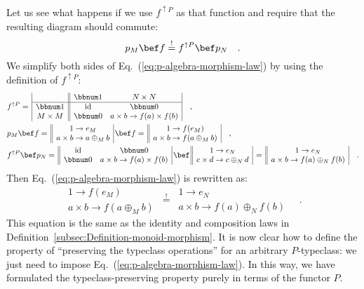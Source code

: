 \noindent Let us see what happens if we use $f^{\uparrow P}$ as that
function and require that the resulting diagram should commute:\vspace{-0.4\baselineskip}
\begin{equation}
p_{M}\bef f\overset{!}{=}f^{\uparrow P}\bef p_{N}\quad.\label{eq:p-algebra-morphism-law}
\end{equation}
We simplify both sides of Eq.~(\ref{eq:p-algebra-morphism-law})
by using the definition of $f^{\uparrow P}$:
\begin{align*}
 & f^{\uparrow P}=\,\begin{array}{|c||cc|}
 & \bbnum 1 & N\times N\\
\hline \bbnum 1 & \text{id} & \bbnum 0\\
M\times M & \bbnum 0 & a\times b\rightarrow f(a)\times f(b)
\end{array}\quad,\\
 & p_{M}\bef f=\,\begin{array}{||c|}
1\rightarrow e_{M}\\
a\times b\rightarrow a\oplus_{M}b
\end{array}\,\bef f=\,\begin{array}{||c|}
1\rightarrow f(e_{M})\\
a\times b\rightarrow f(a\oplus_{M}b)
\end{array}\quad,\\
 & f^{\uparrow P}\bef p_{N}=\,\begin{array}{||cc|}
\text{id} & \bbnum 0\\
\bbnum 0 & a\times b\rightarrow f(a)\times f(b)
\end{array}\,\bef\,\begin{array}{||c|}
1\rightarrow e_{N}\\
c\times d\rightarrow c\oplus_{N}d
\end{array}\,=\,\begin{array}{||c|}
1\rightarrow e_{N}\\
a\times b\rightarrow f(a)\oplus_{N}f(b)
\end{array}\quad.
\end{align*}
Then Eq.~(\ref{eq:p-algebra-morphism-law}) is rewritten as:
\[
\begin{array}{||c|}
1\rightarrow f(e_{M})\\
a\times b\rightarrow f(a\oplus_{M}b)
\end{array}\,\overset{!}{=}\,\begin{array}{||c|}
1\rightarrow e_{N}\\
a\times b\rightarrow f(a)\oplus_{N}f(b)
\end{array}\quad.
\]
This equation is the same as the identity and composition laws in
Definition~\ref{subsec:Definition-monoid-morphism}. It is now clear
how to define the property of \textsf{``}preserving the typeclass operations\textsf{''}
for an arbitrary $P$-typeclass: we just need to impose Eq.~(\ref{eq:p-algebra-morphism-law}).
In this way, we have formulated the typeclass-preserving property
purely in terms of the functor $P$.


